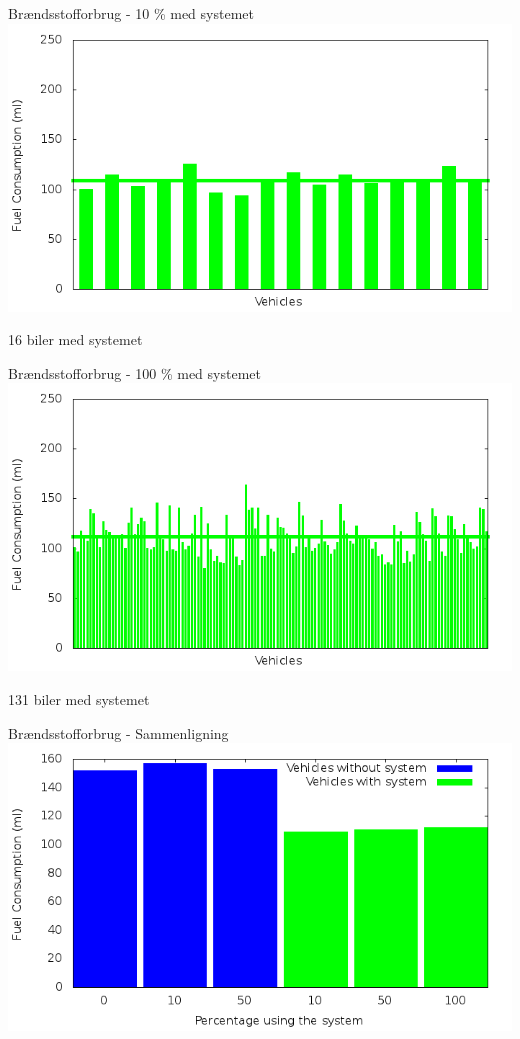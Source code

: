 \begin{frame}{Brændsstofforbrug - 10 \% med systemet}
\includegraphics[width=1\textwidth]{../images/tp0/fuelRouteControlled10.png}

16 biler med systemet
\end{frame}

\begin{frame}{Brændsstofforbrug - 100 \% med systemet}
\includegraphics[width=1\textwidth]{../images/tp0/fuelRouteControlled100.png}

131 biler med systemet
\end{frame}

\begin{frame}{Brændsstofforbrug - Sammenligning}
\includegraphics[width=1\textwidth]{../images/tp0/combinedFuel.png}
\end{frame}

